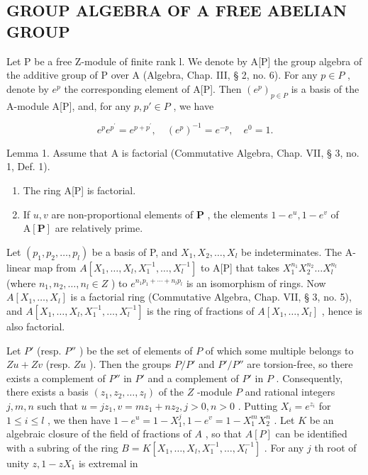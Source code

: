 \subsection{GROUP ALGEBRA OF A FREE ABELIAN GROUP}

Let P be a free Z-module of finite rank l. We denote by A{[}P{]} the group algebra of the additive group of P over A (Algebra, Chap. III, § 2, no. 6). For any \(p \in P\) , denote by \(e^{p}\) the corresponding element of A{[}P{]}. Then \((e^{p})_{p \in P}\) is a basis of the A-module A{[}P{]}, and, for any \(p, p' \in P\) , we have

\[
e ^ {p} e ^ {p ^ {\prime}} = e ^ {p + p ^ {\prime}}, \quad (e ^ {p}) ^ {- 1} = e ^ {- p}, \quad e ^ {0} = 1.
\]

Lemma 1. Assume that A is factorial (Commutative Algebra, Chap. VII, § 3, no. 1, Def. 1).

\begin{enumerate}
\def\labelenumi{(\roman{enumi})}
\item
  The ring A{[}P{]} is factorial.
\item
  If \(u, v\) are non-proportional elements of \(\mathbf{P}\) , the elements \(1 - e^u, 1 - e^v\) of \(\mathrm{A}[\mathbf{P}]\) are relatively prime.
\end{enumerate}

Let \((p_{1}, p_{2}, \ldots, p_{l})\) be a basis of P, and \(X_{1}, X_{2}, \ldots, X_{l}\) be indeterminates. The A-linear map from \(A[X_{1}, \ldots, X_{l}, X_{1}^{-1}, \ldots, X_{l}^{-1}]\) to A{[}P{]} that takes \(X_{1}^{n_{1}} X_{2}^{n_{2}} \ldots X_{l}^{n_{l}}\) (where \(n_{1}, n_{2}, \ldots, n_{l} \in Z\) ) to \(e^{n_{1} p_{1} + \cdots + n_{l} p_{l}}\) is an isomorphism of rings. Now \(A[X_{1}, \ldots, X_{l}]\) is a factorial ring (Commutative Algebra, Chap. VII, § 3, no. 5), and \(A[X_{1}, \ldots, X_{l}, X_{1}^{-1}, \ldots, X_{l}^{-1}]\) is the ring of fractions of \(A[X_{1}, \ldots, X_{l}]\) , hence is also factorial.

Let \(P'\) (resp. \(P''\) ) be the set of elements of \(P\) of which some multiple belongs to \(Zu + Zv\) (resp. \(Zu\) ). Then the groups \(P/P'\) and \(P'/P''\) are torsion-free, so there exists a complement of \(P''\) in \(P'\) and a complement of \(P'\) in \(P\) . Consequently, there exists a basis \((z_1, z_2, \ldots, z_l)\) of the \(Z\) -module \(P\) and rational integers \(j, m, n\) such that \(u = jz_1, v = mz_1 + nz_2, j > 0, n > 0\) . Putting \(X_i = e^{z_i}\) for \(1 \leqslant i \leqslant l\) , we then have \(1 - e^u = 1 - X_1^j, 1 - e^v = 1 - X_1^m X_2^n\) . Let \(K\) be an algebraic closure of the field of fractions of \(A\) , so that \(A[P]\) can be identified with a subring of the ring \(B = K[X_1, \ldots, X_l, X_1^{-1}, \ldots, X_l^{-1}]\) . For any \(j\) th root of unity \(z, 1 - zX_1\) is extremal in

